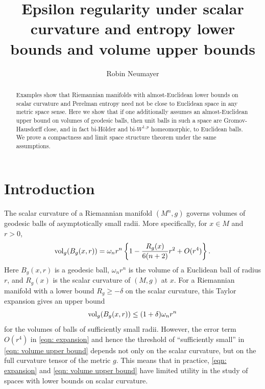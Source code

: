 \documentclass[11pt,reqno]{amsart}
\author{Robin Neumayer}
\title[Scalar lower bounds and volume upper bounds]{Epsilon regularity under  scalar curvature and entropy lower bounds and volume upper bounds}
\theoremstyle{remark}
\theoremstyle{definition}
\numberwithin{equation}{section}
\newcommand{\vol}{{\rm{vol}}}
\begin{document}
\maketitle
\begin{abstract}
	Examples show that Riemannian manifolds 
with almost-Euclidean lower bounds on scalar curvature and Perelman entropy need not be close to Euclidean space in any metric space sense. Here we show that if one additionally assumes an almost-Euclidean upper bound on volumes of geodesic balls, then unit balls in such a space are Gromov-Hausdorff close, and in fact bi-H\"{o}lder and bi-$W^{1,p}$ homeomorphic, to Euclidean balls. We  prove a compactness and limit space structure theorem under the same assumptions.
\end{abstract}
\section{Introduction}
The scalar curvature of a Riemannian manifold $(M^n, g)$ governs volumes of geodesic balls of asymptotically small radii. More specifically,  for $x \in M$ and $r>0$, 
\begin{equation}
	\label{eqn: expansion}
\vol_g(B_g(x,r)) = \omega_n r^n \left\{ 1 - \frac{R_g(x)}{6(n+2)} r^2  + O(r^4) \right\}.
\end{equation}
Here $B_g(x,r)$ is a geodesic ball, $\omega_n r^n$ is the volume of a Euclidean ball of radius $r$, and $R_g(x)$ is the scalar curvature of $(M,g)$ at $x.$ For a Riemannian manifold with a lower bound $R_g \geq -\delta$ on the scalar curvature,  this Taylor expansion gives an upper bound \begin{equation}\label{eqn: volume upper bound}
\vol_g(B_g(x,r)) \leq (1+\delta)\omega_n r^n
\end{equation}
for the volumes of balls of sufficiently small radii.  However, the error term $O(r^4)$ in \eqref{eqn: expansion} and hence the threshold of ``sufficiently small'' in \eqref{eqn: volume upper bound} depends not only on the scalar curvature, but on the full curvature tensor of the metric $g$. This means that in practice, \eqref{eqn: expansion} and \eqref{eqn: volume upper bound} have limited utility in the study of spaces with lower bounds on scalar curvature.
\end{document}
